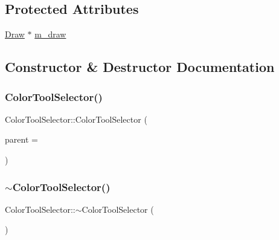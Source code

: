 \subsection*{Protected Attributes}
\begin{DoxyCompactItemize}
\item 
\hyperlink{class_draw}{Draw} $\ast$ \hyperlink{class_color_tool_selector_af2464293935f4a53d1cbcc3b0596823d}{m\+\_\+draw}
\end{DoxyCompactItemize}


\subsection{Constructor \& Destructor Documentation}
\mbox{\label{class_color_tool_selector_a42acf2fbc6dea5c4575ed166f3362c92}} 
\subsubsection{\texorpdfstring{Color\+Tool\+Selector()}{ColorToolSelector()}}
{\footnotesize\ttfamily Color\+Tool\+Selector\+::\+Color\+Tool\+Selector (\begin{DoxyParamCaption}\item[{Q\+Widget $\ast$}]{parent = {} }\end{DoxyParamCaption})\hspace{0.3cm}{\ttfamily [explicit]}}

\mbox{\label{class_color_tool_selector_a461eb04b3d3d25bee5bb5848488f0b0d}} 
\subsubsection{\texorpdfstring{$\sim$\+Color\+Tool\+Selector()}{~ColorToolSelector()}}
{\footnotesize\ttfamily Color\+Tool\+Selector\+::$\sim$\+Color\+Tool\+Selector (\begin{DoxyParamCaption}{ }\end{DoxyParamCaption})}



